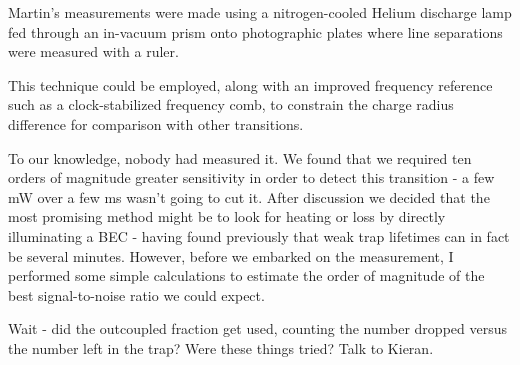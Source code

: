 	Martin's measurements were made using a nitrogen-cooled Helium discharge lamp fed through an in-vacuum prism onto photographic plates where line separations were measured with a ruler.
	

	This technique could be employed, along with an improved frequency reference such as a clock-stabilized frequency comb, to constrain the charge radius difference for comparison with other transitions.




	To our knowledge, nobody had measured it.
	We found that we required ten orders of magnitude greater sensitivity in order to detect this transition - a few mW over a few ms wasn't going to cut it.
	After discussion we decided that the most promising method might be to look for heating or loss by directly illuminating a BEC - having found previously that weak trap lifetimes can in fact be several minutes.
	However, before we embarked on the measurement, I performed some simple calculations to estimate the order of magnitude of the best signal-to-noise ratio we could expect.



	Wait - did the outcoupled fraction get used, counting the number dropped versus the number left in the trap? Were these things tried? Talk to Kieran.

